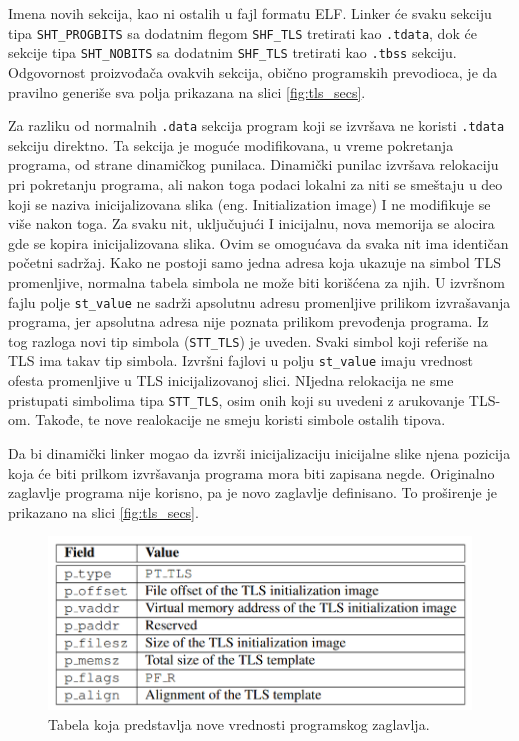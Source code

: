 \documentclass[12pt,oneside]{memoir}
\begin{document}
Imena novih sekcija, kao ni ostalih u fajl formatu ELF. Linker će svaku sekciju tipa \texttt{SHT\_PROGBITS} sa dodatnim flegom \texttt{SHF\_TLS} tretirati kao \texttt{.tdata}, dok će sekcije tipa \texttt{SHT\_NOBITS} sa dodatnim \texttt{SHF\_TLS} tretirati kao \texttt{.tbss} sekciju. Odgovornost proizvođača ovakvih sekcija, obično programskih prevodioca, je da pravilno generiše sva polja prikazana na slici \ref{fig:tls_secs}.

Za razliku od normalnih \texttt{.data} sekcija program koji se izvršava ne koristi \texttt{.tdata} sekciju direktno. Ta sekcija je moguće modifikovana, u vreme pokretanja programa, od strane dinamičkog punilaca. Dinamički punilac izvršava relokaciju pri pokretanju programa, ali nakon toga podaci lokalni za niti se smeštaju u deo koji se naziva inicijalizovana slika (eng. Initialization image) I ne modifikuje se više nakon toga. Za svaku nit, uključujući I inicijalnu, nova memorija se alocira gde se kopira inicijalizovana slika. Ovim se omogućava da svaka nit ima identičan početni sadržaj. Kako ne postoji samo jedna adresa koja ukazuje na simbol TLS promenljive, normalna tabela simbola ne može biti korišćena za njih. U izvršnom fajlu polje \texttt{st\_value} ne sadrži apsolutnu adresu promenljive prilikom izvrašavanja programa, jer apsolutna adresa nije poznata prilikom prevođenja programa. Iz tog razloga novi tip simbola (\texttt{STT\_TLS}) je uveden. Svaki simbol koji referiše na TLS ima takav tip simbola. Izvršni fajlovi u polju \texttt{st\_value} imaju vrednost ofesta promenljive u TLS inicijalizovanoj slici.
NIjedna relokacija ne sme pristupati simbolima tipa \texttt{STT\_TLS}, osim onih koji su uvedeni z
arukovanje TLS-om. Takođe, te nove realokacije ne smeju koristi simbole ostalih tipova.

Da bi dinamički linker mogao da izvrši inicijalizaciju inicijalne slike njena pozicija koja će biti prilkom
izvršavanja programa mora biti zapisana negde. Originalno zaglavlje programa nije korisno, pa je
novo zaglavlje definisano. To proširenje je prikazano na slici \ref{fig:tls_secs}.

\begin{figure}[h!]
	\begin{center}
		\includegraphics[scale=0.6]{slike/tabela2ProgramTLSheader.png}
	\end{center}
	\caption{Tabela koja predstavlja nove vrednosti programskog zaglavlja.}
	\label{fig:tls_prheader}
\end{figure}
\end{document}
